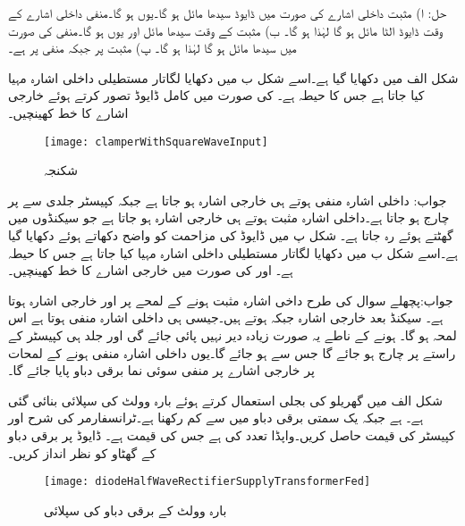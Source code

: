 حل:
ا) مثبت داخلی اشارے کی صورت میں ڈایوڈ سیدھا مائل ہو گا۔یوں  ہو گا۔منفی داخلی اشارے کے وقت ڈایوڈ الٹا مائل ہو گا لہٰذا  ہو گا۔ ب) مثبت  کے وقت  سیدھا مائل اور یوں  ہو گا۔منفی  کی صورت میں  سیدھا مائل ہو گا لہٰذا  ہو گا۔ پ) مثبت  پر   جبکہ منفی  پر  ہے۔

شکل  الف میں  دکھایا گیا ہے۔اسے شکل  ب میں دکھایا لگاتار مستطیلی داخلی اشارہ مہیا کیا جاتا ہے جس کا حیطہ  ہے۔ کی صورت میں  کامل ڈایوڈ تصور کرتے ہوئے خارجی اشارے کا خط کھینچیں۔
\begin{figure}
\centering
\texttt{[image: clamperWithSquareWaveInput]}
\caption{شکنجہ}
\label{شکل_سوالات_شکنجہ}
\end{figure}

جواب: داخلی اشارہ منفی ہوتے ہی خارجی اشارہ  ہو جاتا ہے جبکہ کپیسٹر جلدی سے  پر چارج ہو جاتا ہے۔داخلی اشارہ مثبت ہوتے ہی خارجی اشارہ  ہو جاتا ہے جو  سیکنڈوں میں گھٹتے ہوئے  رہ جاتا ہے۔
شکل  پ میں ڈایوڈ کی مزاحمت  کو واضح دکھاتے ہوئے  دکھایا گیا ہے۔اسے شکل  ب میں دکھایا لگاتار مستطیلی داخلی اشارہ مہیا کیا جاتا ہے  جس کا حیطہ  ہے۔ اور  کی صورت میں خارجی اشارے کا خط کھینچیں۔

جواب:پچھلے سوال کی طرح داخی اشارہ مثبت ہونے کے لمحے پر  اور خارجی اشارہ  ہوتا ہے۔ سیکنڈ بعد خارجی اشارہ  جبکہ  ہوتے ہیں۔جیسی ہی داخلی اشارہ منفی ہوتا ہے اس لمحہ  ہو گا۔ ہونے کے ناطے یہ صورت زیادہ دیر نہیں پائی جائے گی اور جلد ہی کپیسٹر  کے راستے  پر چارج ہو جائے گا جس سے  ہو جائے گا۔یوں داخلی اشارہ منفی ہونے کے لمحات پر خارجی اشارے پر منفی سوئی نما برقی دباو پایا جائے گا۔

شکل  الف میں گھریلو  کی بجلی استعمال کرتے ہوئے بارہ وولٹ کی سپلائی بنائی گئی ہے۔ ہے جبکہ یک سمتی برقی دباو میں   سے کم رکھنا ہے۔ٹرانسفارمر کی شرح  اور کپیسٹر کی قیمت حاصل کریں۔واپڈا  تعدد کی  ہے جس کی  قیمت  ہے۔ ڈایوڈ پر برقی دباو کے گھٹاو کو نظر انداز کریں۔
\begin{figure}
\centering
\texttt{[image: diodeHalfWaveRectifierSupplyTransformerFed]}
\caption{بارہ وولٹ کے برقی دباو کی سپلائی}
\label{شکل_بارہ_وولٹ-سپلائی}
\end{figure}

